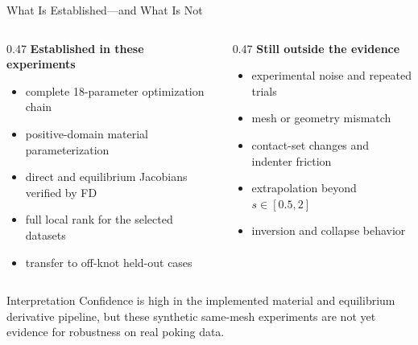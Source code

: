 \documentclass[aspectratio=169,10pt]{beamer}
\newcommand{\good}[1]{\textcolor{pgoGreen}{#1}}
\newcommand{\warn}[1]{\textcolor{pgoOrange}{#1}}
\begin{document}
\begin{frame}{What Is Established---and What Is Not}
  \small
  \begin{columns}[T,onlytextwidth]
    \begin{column}{0.47\linewidth}
      \textbf{\good{Established in these experiments}}
      \begin{itemize}
        \item complete 18-parameter optimization chain
        \item positive-domain material parameterization
        \item direct and equilibrium Jacobians verified by FD
        \item full local rank for the selected datasets
        \item transfer to off-knot held-out cases
      \end{itemize}
    \end{column}
    \begin{column}{0.47\linewidth}
      \textbf{\warn{Still outside the evidence}}
      \begin{itemize}
        \item experimental noise and repeated trials
        \item mesh or geometry mismatch
        \item contact-set changes and indenter friction
        \item extrapolation beyond $s\in[0.5,2]$
        \item inversion and collapse behavior
      \end{itemize}
    \end{column}
  \end{columns}

  \vspace{0.6em}
  \begin{block}{Interpretation}
    Confidence is high in the implemented material and equilibrium derivative
    pipeline, but these synthetic same-mesh experiments are not yet evidence
    for robustness on real poking data.
  \end{block}
\end{frame}
\end{document}
